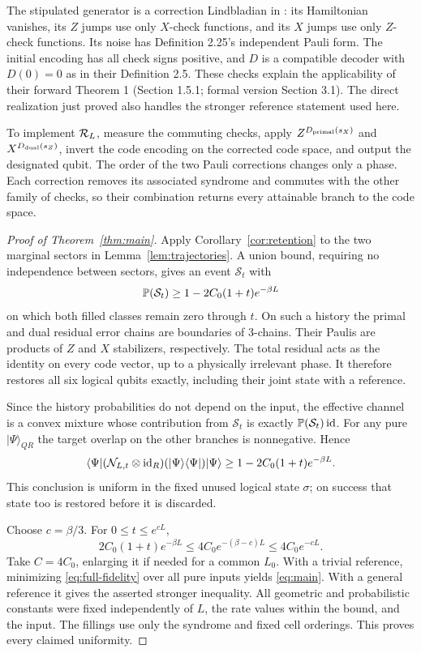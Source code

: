 The stipulated generator is a correction Lindbladian in
\cite[Definition 2.24]{DOA}: its Hamiltonian vanishes, its \(Z\)
jumps use only \(X\)-check functions, and its \(X\) jumps use only
\(Z\)-check functions. Its noise has Definition 2.25's independent
Pauli form. The initial encoding has all check signs positive,
and \(D\) is a compatible decoder with \(D(0)=0\) as in their
Definition 2.5. These checks explain the applicability of their
forward Theorem 1 (Section 1.5.1; formal version Section 3.1). The direct realization just proved also handles
the stronger reference statement used here.

To implement \(\mathcal R_L\), measure the commuting checks, apply
\(Z^{D_{\rm primal}(s_X)}\) and
\(X^{D_{\rm dual}(s_Z)}\), invert the code encoding on the corrected
code space, and output the designated qubit. The order of the two
Pauli corrections changes only a phase. Each correction removes
its associated syndrome and commutes with the other family of
checks, so their combination returns every attainable branch to
the code space.

\begin{proof}[Proof of Theorem~\ref{thm:main}]
Apply Corollary~\ref{cor:retention} to the two marginal sectors in
Lemma~\ref{lem:trajectories}. A union bound, requiring no independence
between sectors, gives an event \(\mathcal S_t\) with
\[
 \mathbb P(\mathcal S_t)\ge1-2C_0(1+t)e^{-\beta L}
\]
on which both filled classes remain zero through \(t\).
On such a history the primal and dual residual error chains are
boundaries of 3-chains. Their Paulis are products of \(Z\) and \(X\)
stabilizers, respectively. The total residual acts as the identity
on every code vector, up to a physically irrelevant phase.
It therefore restores all six logical qubits exactly, including
their joint state with a reference.

Since the history probabilities do not depend on the input,
the effective channel is a convex mixture whose contribution from
\(\mathcal S_t\) is exactly
\(\mathbb P(\mathcal S_t)\operatorname{id}\). For any pure \(|\Psi\rangle_{QR}\) the
target overlap on the other branches is nonnegative. Hence
\begin{equation}\label{eq:full-fidelity}
 \langle\Psi|(\mathcal N_{L,t}\otimes\operatorname{id}_R)
  (|\Psi\rangle\langle\Psi|)|\Psi\rangle
 \ge1-2C_0(1+t)e^{-\beta L}.
\end{equation}
This conclusion is uniform in the fixed unused logical state
\(\sigma\); on success that state too is restored before it is
discarded.

Choose \(c=\beta/3\). For \(0\le t\le e^{cL}\),
\[
 2C_0(1+t)e^{-\beta L}
 \le4C_0e^{-(\beta-c)L}
 \le4C_0e^{-cL}.
\]
Take \(C=4C_0\), enlarging it if needed for a common \(L_0\).
With a trivial reference, minimizing \eqref{eq:full-fidelity} over
all pure inputs yields \eqref{eq:main}. With a general reference
it gives the asserted stronger inequality. All geometric and
probabilistic constants were fixed independently of \(L\), the
rate values within the bound, and the input. The fillings use only
the syndrome and fixed cell orderings. This proves every claimed
uniformity.
\end{proof}

